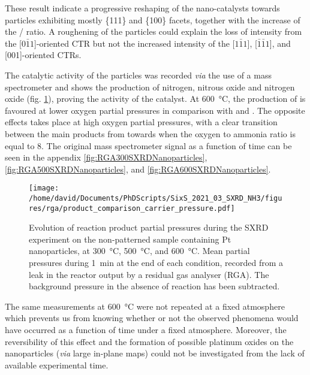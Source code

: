 These result indicate a progressive reshaping of the nano-catalysts towards particles exhibiting mostly \{111\} and \{100\} facets, together with the increase of the / ratio.
A roughening of the particles could explain the loss of intensity from the [$0\bar{1}1$]-oriented CTR but not the increased intensity of the [$1\bar{1}1$], [$\bar{1}\bar{1}1$], and [001]-oriented CTRs.

The catalytic activity of the particles was recorded \textit{via} the use of a mass spectrometer and shows the production of nitrogen, nitrous oxide and nitrogen oxide (fig. \ref{fig:RGASXRDNanoparticlesComparison}), proving the activity of the catalyst.
At \qty{600}{\degreeCelsius}, the production of  is favoured at lower oxygen partial pressures in comparison with  and .
The opposite effects takes place at high oxygen partial pressures, with a clear transition between the main products from  towards  when the oxygen to ammonia ratio is equal to 8.
The original mass spectrometer signal as a function of time can be seen in the appendix \ref{fig:RGA300SXRDNanoparticles}, \ref{fig:RGA500SXRDNanoparticles}, and \ref{fig:RGA600SXRDNanoparticles}.

\begin{figure}[!htb]
    \centering
    \texttt{[image: /home/david/Documents/PhDScripts/SixS\_2021\_03\_SXRD\_NH3/figures/rga/product\_comparison\_carrier\_pressure.pdf]}
    \caption{
        Evolution of reaction product partial pressures during the SXRD experiment on the non-patterned sample containing Pt nanoparticles, at \qty{300}{\degreeCelsius}, \qty{500}{\degreeCelsius}, and \qty{600}{\degreeCelsius}.
        Mean partial pressures during \qty{1}{\minute} at the end of each condition, recorded from a leak in the reactor output by a residual gas analyser (RGA).
        The background pressure in the absence of reaction has been subtracted.
    }
    \label{fig:RGASXRDNanoparticlesComparison}
\end{figure}

The same measurements at \qty{600}{\degreeCelsius} were not repeated at a fixed atmosphere which prevents us from knowing whether or not the observed phenomena would have occurred as a function of time under a fixed atmosphere.
Moreover, the reversibility of this effect and the formation of possible platinum oxides on the nanoparticles (\textit{via} large in-plane maps) could not be investigated from the lack of available experimental time.

